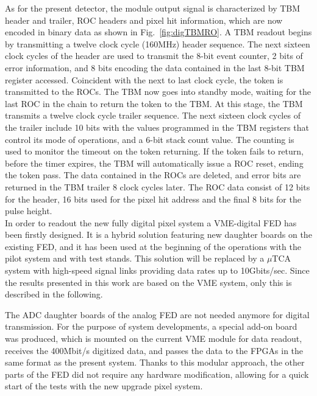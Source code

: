 As for the present detector, the module output signal is characterized by TBM header and trailer, ROC headers and pixel hit information, which are now encoded in binary data as shown in Fig.~\ref{fig:digTBMRO}.
A TBM readout begins by transmitting a twelve clock cycle (160\unit{MHz}) header sequence.
The next sixteen clock cycles of the header are used to transmit the 8-bit event counter, 2 bits of error information, and 8 bits encoding the data contained in the last 8-bit TBM register accessed.
Coincident with the next to last clock cycle, the token is transmitted to the ROCs. The TBM now goes into standby mode, waiting for the last ROC in the chain to return the token to the TBM.
At this stage, the TBM transmits a twelve clock cycle trailer sequence.
The next sixteen clock cycles of the trailer include 10 bits with the values programmed in the TBM registers that control its mode of operations, and a 6-bit stack count value.
The counting is used to monitor the timeout on the token returning. If the token fails to return, before the timer expires, the TBM will automatically issue a ROC reset, ending the token pass.
The data contained in the ROCs are deleted, and error bits are returned in the TBM trailer 8 clock cycles later.
The ROC data consist of 12 bits for the header, 16 bits used for the pixel hit address and the final 8 bits for the pulse height.\\

In order to readout the new fully digital pixel system a VME-digital FED has been firstly designed.
It is a hybrid solution featuring new daughter boards on the existing FED, and it has been used at the beginning of the operations with the pilot system and with test stands.
This solution will be replaced by a $\mu$TCA system with high-speed signal links providing data rates up to 10\unit{Gbits/sec}. 
Since the results presented in this work are based on the VME system, only this is described in the following.

The ADC daughter boards of the analog FED are not needed anymore for digital transmission.
For the purpose of system developments, a special add-on board was produced, which is mounted on the current VME module for data readout, receives the 400\unit{Mbit/s} digitized data, and passes the data to the FPGAs in the same format as the present system.
Thanks to this modular approach, the other parts of the FED did not require any hardware modification, allowing for a quick start of the tests with the new upgrade pixel system.

